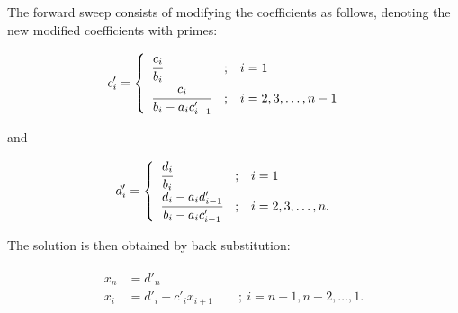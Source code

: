 \documentclass[twocolumn,10pt]{asme2ej}
\begin{document}
The forward sweep consists of modifying the coefficients as follows, denoting the new modified coefficients with primes:

\begin{equation}
c'_i =
\begin{cases}
\begin{array}{lcl}
  \cfrac{c_i}{b_i}                  & ; & i = 1 \\
  \cfrac{c_i}{b_i - a_i c'_{i - 1}} & ; & i = 2, 3, \dots, n-1 \\
\end{array}
\end{cases}
\,\end{equation}

and

\begin{equation}
d'_i =
\begin{cases}
\begin{array}{lcl}
  \cfrac{d_i}{b_i}                  & ; & i = 1 \\
  \cfrac{d_i - a_i d'_{i - 1}}{b_i - a_i c'_{i - 1}} & ; & i = 2, 3, \dots, n. \\
\end{array}
\end{cases}
\,\end{equation}

The solution is then obtained by back substitution:

\begin{multline}
\begin{split}
x_n & = d'_n\, \\
x_i & = d'_i - c'_i x_{i + 1} \qquad ; \ i = n - 1, n - 2, \ldots, 1.
\end{split}
\end{multline}



\end{document}
